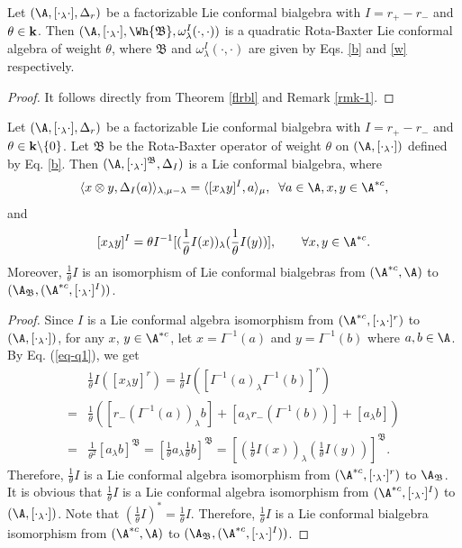 \documentclass[12pt]{amsart}
\begin{document}
\begin{corollary}
Let $(\A,[\cdot_\lambda \cdot],\Delta_r)$ be a factorizable Lie
conformal bialgebra with $I=r_+-r_-$ and $\theta\in {\bf k}$. Then
$(\A,[\cdot_\lambda\cdot],\Wh{\mathfrak{B}},\omega^I_\lambda(\cdot,\cdot))$
is a quadratic   Rota-Baxter Lie conformal
algebra of weight  $\theta$, where $\mathfrak{B}$ and $\omega^I_\lambda(\cdot,\cdot)$
are given by Eqs. \eqref{b} and \eqref{w} respectively.
\end{corollary}
\begin{proof}
It follows directly from Theorem \ref{flrbl} and Remark \ref{rmk-1}.
\end{proof}
\begin{corollary}\label{cfrbl}
Let $(\A,[\cdot_\lambda \cdot],\Delta_r)$ be a factorizable Lie
conformal bialgebra with $I=r_+-r_-$ and $\theta\in {\bf
k}\backslash\{0\}$. Let $\mathfrak{B}$ be the Rota-Baxter
operator of weight $\theta$ on $(\A, [\cdot_\lambda \cdot])$
defined by Eq. \eqref{b}. Then
$(\A,[\cdot_\lambda\cdot]^\mathfrak{B},\Delta_I)$ is  a Lie
conformal bialgebra, where $$\langle x\otimes y,
\Delta_I(a)\rangle_{\lambda, \mu-\lambda}=\langle [x_\lambda y]^I,
a\rangle_\mu,\;\; \forall a\in \A, x,y\in \A^{*c},$$ and
$$
[x_\lambda y]^I=\theta I^{-1}[(\frac{1}{\theta}I (x))_\lambda  (\frac{1}{\theta}I (y))],\qquad \forall   x,y\in \A^{*c}.
$$
Moreover, $\frac{1}{\theta}I$ is an isomorphism of Lie conformal bialgebras from $(\A^{*c}, \A)$ to $(\A_\mathfrak{B}, (\A^{*c},[\cdot_\lambda\cdot]^I))$.
\end{corollary}
\begin{proof}
Since $I$ is a Lie conformal algebra isomorphism from $(\A^{*c},[\cdot_\lambda\cdot]^r)$ to $(\A,[\cdot_\lambda\cdot])$,  for any $x$, $y\in \A^{*c}$, let $x=I^{-1}(a) $ and $y=I^{-1}(b)$ where $a,b\in \A$. By Eq. (\ref{eq-q1}), we get
\begin{align*}
    &\frac{1}{\theta}I([x_\lambda y]^r)=\frac{1}{\theta}I([I^{-1}(a)_\lambda I^{-1}(b)]^r)\\
    =&\frac{1}{\theta}( [ r_- (I^{-1}(a))_\lambda b]+[a_\lambda r_-(I^{-1}(b))]+[a_\lambda b] )\\
    =&\frac{1}{\theta^2}[a_\lambda b]^\mathfrak{B}=[ \frac{1}{\theta} a_\lambda \frac{1}{\theta} b]^\mathfrak{B}
    =[(\frac{1}{\theta}I(x))_\lambda   (\frac{1}{\theta}I(y))]^\mathfrak{B}.
\end{align*}
Therefore, $\frac{1}{\theta}I$ is a Lie conformal algebra isomorphism from $(\A^{*c},[\cdot_\lambda\cdot]^r)$ to $\A_\mathfrak{B}$.  It is obvious that  $ \frac{1}{\theta}I$ is a Lie conformal algebra isomorphism from $(\A^{*c},[\cdot_\lambda\cdot]^I)$ to $(\A,[\cdot_\lambda\cdot])$. Note that $ (\frac{1}{\theta}I)^\ast=\frac{1}{\theta}I$. Therefore, $\frac{1}{\theta}I$ is a  Lie conformal bialgebra isomorphism from $(\A^{*c},\A)$ to  $(\A_\mathfrak{B},(\A^{*c},[\cdot_\lambda\cdot]^I)) $.
\end{proof}
\end{document}
